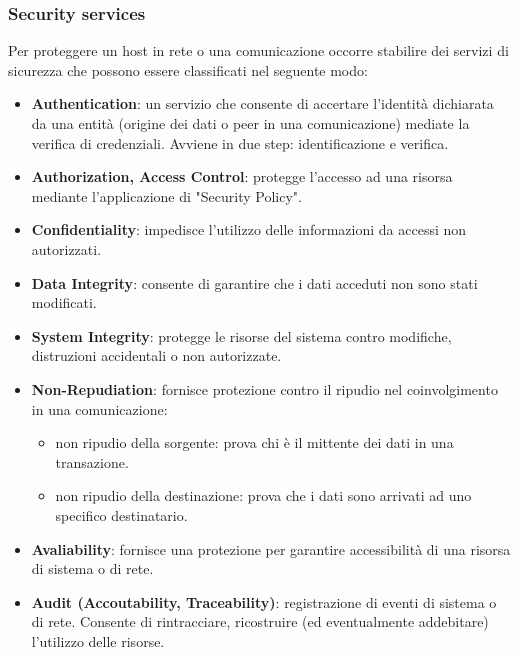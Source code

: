         \subsubsection{Security services}
            Per proteggere un host in rete o una comunicazione occorre stabilire dei servizi di sicurezza che possono essere classificati nel seguente modo:
            \begin{itemize}
                \item \textbf{Authentication}: un servizio che consente di accertare l'identità dichiarata da una entità (origine dei dati o peer in una comunicazione) mediate la verifica di credenziali.
                Avviene in due step: identificazione e verifica.
                \item \textbf{Authorization, Access Control}: protegge l'accesso ad una risorsa mediante l'applicazione di "Security Policy".
                \item \textbf{Confidentiality}: impedisce l'utilizzo delle informazioni da accessi non autorizzati.
                \item \textbf{Data Integrity}: consente di garantire che i dati acceduti non sono stati modificati.
                \item \textbf{System Integrity}: protegge le risorse del sistema contro modifiche, distruzioni accidentali o non autorizzate.
                \item \textbf{Non-Repudiation}: fornisce protezione contro il ripudio nel coinvolgimento in una comunicazione:
                \begin{itemize}
                    \item non ripudio della sorgente: prova chi è il mittente dei dati in una transazione.
                    \item non ripudio della destinazione: prova che i dati sono arrivati ad uno specifico destinatario.
                \end{itemize}
                \item \textbf{Avaliability}: fornisce una protezione per garantire accessibilità di una risorsa di sistema o di rete.
                \item \textbf{Audit (Accoutability, Traceability)}: registrazione di eventi di sistema o di rete. Consente di rintracciare, ricostruire (ed eventualmente addebitare) l'utilizzo delle risorse.
            \end{itemize}

